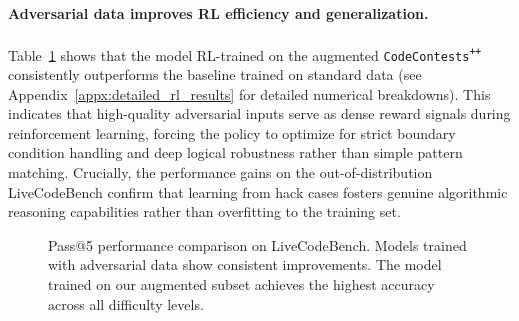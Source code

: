 \documentclass[11pt]{article}
\newcommand{\pl}{\textsuperscript{+}}
\begin{document}
\paragraph{Adversarial data improves RL efficiency and generalization.}
Table~\ref{fig:rl_pass5_performance} shows that the model RL-trained on the augmented \texttt{CodeContests\pl\pl} consistently outperforms the baseline trained on standard data  (see Appendix~\ref{appx:detailed_rl_results} for detailed numerical breakdowns). This indicates that high-quality adversarial inputs serve as dense reward signals during reinforcement learning, forcing the policy to optimize for strict boundary condition handling and deep logical robustness rather than simple pattern matching. Crucially, the performance gains on the out-of-distribution LiveCodeBench confirm that learning from hack cases fosters genuine algorithmic reasoning capabilities rather than overfitting to the training set. 

\begin{figure}[t!]
\centering
{}
\caption{Pass@5 performance comparison on LiveCodeBench. Models trained with adversarial data show consistent improvements. The model trained on our augmented subset achieves the highest accuracy across all difficulty levels.}
\label{fig:rl_pass5_performance}
\vspace{-0.5cm}
\end{figure}
\end{document}
